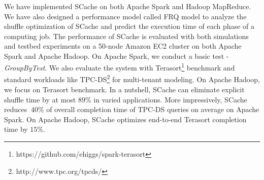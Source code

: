 {\color{black}
We have implemented SCache on both Apache Spark \cite{apachespark} and Hadoop MapReduce. We have also designed a performance model called FRQ model to analyze the shuffle optimization of SCache and predict the execution time of each phase of a computing job. The performance of SCache is evaluated with both simulations and testbed experiments on a 50-node Amazon EC2 cluster on both Apache Spark and Apache Hadoop. On Apache Spark, we conduct a basic test - \textit{GroupByTest}. We also evaluate the system with Terasort\footnote{https://github.com/ehiggs/spark-terasort} benchmark and standard workloads like TPC-DS\footnote{http://www.tpc.org/tpcds/} for multi-tenant modeling. On Apache Hadoop, we focus on Terasort benchmark. In a nutshell, SCache can eliminate explicit shuffle time by at most $89\%$ in varied applications. More impressively, SCache reduces $~40\%$ of overall completion time of TPC-DS queries on average on Apache Spark. On Apache Hadoop, SCache optimizes end-to-end Terasort completion time by $15\%$.
}